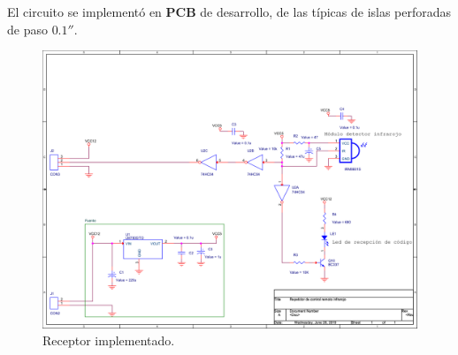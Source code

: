 
El circuito se implementó en \textbf{PCB} de desarrollo, de las típicas de islas perforadas de paso $0.1''$.

\clearpage

\begin{figure}[H]
	\centering
	\includegraphics[width=0.9\paperwidth]{img/SCH/receiver.png}
	\caption{\footnotesize{Receptor implementado.}}
	\label{fig:IR_receiver_real}
\end{figure}



